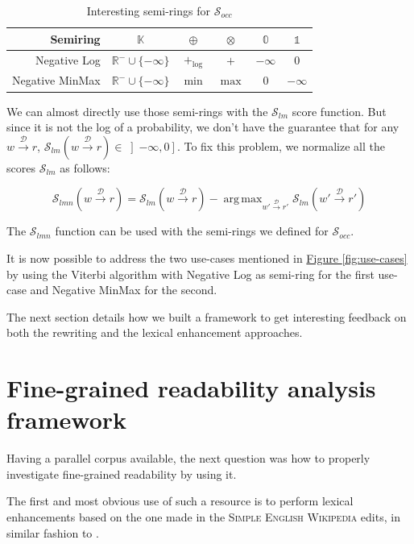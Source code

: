 \documentclass[a4paper, 11pt, onepage]{scrreprt}
\newcommand\sew{\textsc{Simple English Wikipedia}}
\newcommand\figureref[1]{\hyperref[#1]{Figure \ref*{#1}}}
\newcommand\maps[1]{\xrightarrow{\mathcal{#1}}}
\DeclareMathOperator*{\argmax}{\arg\,\max}
\begin{document}
\begin{table}[H]
  \centering
  \begin{tabular}{rccccc}
    \toprule
    Semiring & $\mathbb{K}$ & $\oplus$ & $\otimes$ & $\mathbb{0}$ & $\mathbb{1}$
    \\
    \midrule
    Negative Log & $\mathbb{R}^{-} \cup \{-\infty\}$ & $+_{\log}$ & $+$ & $-\infty$ & $0$ \\
    Negative MinMax & $\mathbb{R}^{-} \cup \{-\infty\}$ & $\min$ & $\max$ & 0 & $-\infty$ \\
  \end{tabular}
  \caption{Interesting semi-rings for $\mathcal{S}_{occ}$}
  \label{tab:semi-rings}
\end{table}

We can almost directly use those semi-rings with the
$\mathcal{S}_{lm}$ score function. But since it is not the log of a
probability, we don't have the guarantee that for any $w \maps{D} r$,
$\mathcal{S}_{lm}\left( w \maps{D} r \right) \in \left]-\infty,
  0\right]$. To fix this problem, we normalize all the scores
$\mathcal{S}_{lm}$ as follows:

\[
\mathcal{S}_{lmn} \left( w \maps{D} r \right)
= \mathcal{S}_{lm} \left( w \maps{D} r \right)
- \argmax_{w' \maps{D} r'} \mathcal{S}_{lm} \left(w' \maps{D} r' \right)
\]

The $\mathcal{S}_{lmn}$ function can be used with the semi-rings we
defined for $\mathcal{S}_{occ}$.

It is now possible to address the two use-cases mentioned in
\figureref{fig:use-cases} by using the Viterbi algorithm
\cite{forney1973viterbi} with Negative Log as semi-ring for the first
use-case and Negative MinMax for the second.

The next section details how we built a framework to get interesting
feedback on both the rewriting and the lexical enhancement
approaches.

\section{Fine-grained readability analysis framework}
\label{sec:framework}

Having a parallel corpus available, the next question was how to
properly investigate fine-grained readability by using it.

The first and most obvious use of such a resource is to perform
lexical enhancements based on the one made in the \sew{} edits, in
similar fashion to \cite{yatskar2010sake}.
\end{document}
